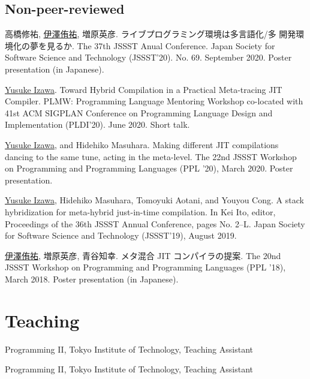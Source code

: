 \documentclass[11pt]{article} %
\newcommand{\YusukeIzawa}{\underline{Yusuke Izawa}}
\newcommand{\伊澤侑祐}{\underline{伊澤侑祐}}
\newcommand{\jit}{\textsc{JIT} }
\begin{document}
\subsection*{Non-peer-reviewed}

 高橋修祐, \伊澤侑祐, 増原英彦. ライブプログラミング環境は多言語化/多
開発環境化の夢を見るか. The 37th JSSST Anual Conference. Japan Society for
Software Science and Technology (JSSST'20). No. 69. September 2020. Poster
presentation (in Japanese).
\medskip

 \YusukeIzawa. Toward Hybrid Compilation in a Practical Meta-tracing
\jit Compiler. PLMW: Programming Language Mentoring Workshop co-located with 41st
ACM SIGPLAN Conference on Programming Language Design and Implementation
(PLDI'20). June 2020. Short talk.
\medskip

 \YusukeIzawa, and Hidehiko Masuhara. Making different \jit
compilations dancing to the same tune, acting in the meta-level. The 22nd JSSST
Workshop on Programming and Programming Languages (PPL '20), March 2020. Poster
presentation.
\medskip

 \YusukeIzawa, Hidehiko Masuhara, Tomoyuki Aotani, and Youyou
Cong. A stack hybridization for meta-hybrid just-in-time compilation. In Kei
Ito, editor, Proceedings of the 36th JSSST Annual Conference, pages
No. 2–L. Japan Society for Software Science and Technology (JSSST'19), August
2019.
\medskip


 \伊澤侑祐, 増原英彦, 青谷知幸. メタ混合 \jit コンパイラの提案. The
20nd JSSST Workshop on Programming and Programming Languages (PPL '18), March
2018. Poster presentation (in Japanese).
\medskip


\section*{Teaching}

 Programming II, Tokyo Institute of Technology, Teaching Assistant

 Programming II, Tokyo Institute of Technology, Teaching Assistant
\end{document}
